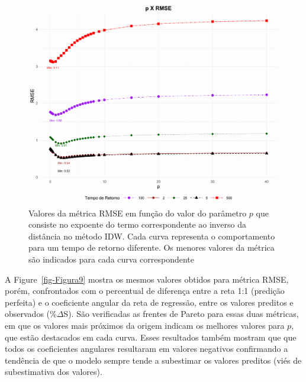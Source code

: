 \documentclass[
]{agujournal2019}
\begin{document}
\begin{figure}

\begin{minipage}{\linewidth}

\includegraphics{Figuras/Figura8.png}

\end{minipage}%

\caption{\label{fig-Figura8}Valores da métrica RMSE em função do valor
do parâmetro \(p\) que consiste no expoente do termo correspondente ao
inverso da distância no método IDW. Cada curva representa o
comportamento para um tempo de retorno diferente. Os menores valores da
métrica são indicados para cada curva correspondente}

\end{figure}%

A Figure~\ref{fig-Figura9} mostra os mesmos valores obtidos para métrica
RMSE, porém, confrontados com o percentual de diferença entre a reta 1:1
(predição perfeita) e o coeficiente angular da reta de regressão, entre
os valores preditos e observados (\%\(\Delta\)S). São verificadas as
frentes de Pareto para essas duas métricas, em que os valores mais
próximos da origem indicam os melhores valores para \(p\), que estão
destacados em cada curva. Esses resultados também mostram que que todos
os coeficientes angulares resultaram em valores negativos confirmando a
tendência de que o modelo sempre tende a subestimar os valores preditos
(viés de subestimativa dos valores).
\end{document}
